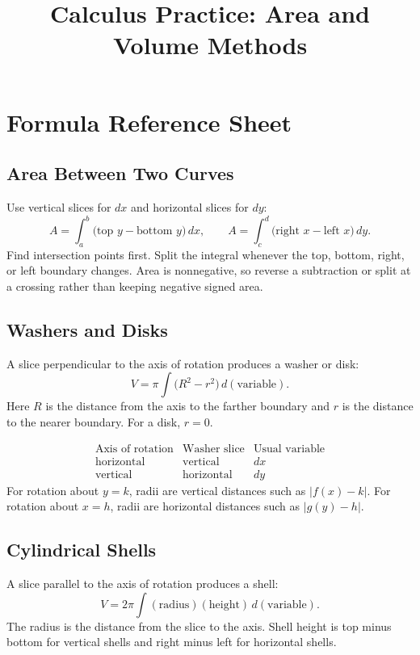 \documentclass[12pt]{article}
\title{Calculus Practice: Area and Volume Methods}
\author{}
\date{}
\begin{document}
\maketitle

\section*{Formula Reference Sheet}

\subsection*{Area Between Two Curves}
Use vertical slices for $dx$ and horizontal slices for $dy$:
\[
 A=\int_a^b\bigl(\text{top }y-\text{bottom }y\bigr)\,dx,
 \qquad
 A=\int_c^d\bigl(\text{right }x-\text{left }x\bigr)\,dy.
\]
Find intersection points first. Split the integral whenever the top, bottom, right, or left boundary changes. Area is nonnegative, so reverse a subtraction or split at a crossing rather than keeping negative signed area.

\subsection*{Washers and Disks}
A slice perpendicular to the axis of rotation produces a washer or disk:
\[
 V=\pi\int\bigl(R^2-r^2\bigr)\,d(\text{variable}).
\]
Here $R$ is the distance from the axis to the farther boundary and $r$ is the distance to the nearer boundary. For a disk, $r=0$.

\[
\begin{array}{c|c|c}
\text{Axis of rotation} & \text{Washer slice} & \text{Usual variable}\\ \hline
\text{horizontal} & \text{vertical} & dx\\
\text{vertical} & \text{horizontal} & dy
\end{array}
\]
For rotation about $y=k$, radii are vertical distances such as $|f(x)-k|$. For rotation about $x=h$, radii are horizontal distances such as $|g(y)-h|$.

\subsection*{Cylindrical Shells}
A slice parallel to the axis of rotation produces a shell:
\[
 V=2\pi\int(\text{radius})(\text{height})\,d(\text{variable}).
\]
The radius is the distance from the slice to the axis. Shell height is top minus bottom for vertical shells and right minus left for horizontal shells.
\end{document}
